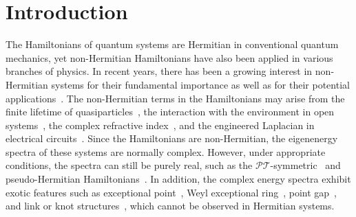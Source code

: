 \documentclass[prb,aps,twocolumn,showpacs]{revtex4-2} %
\begin{document}
\section{Introduction}\label{sect1}
The Hamiltonians of quantum systems are Hermitian in conventional quantum mechanics, yet non-Hermitian Hamiltonians have also been applied in various branches of physics. In recent years, there has been a growing interest in non-Hermitian systems for their fundamental importance as well as for their potential applications~\cite{Cao2015RMP,Konotop2016RMP,Ganainy2018NatPhy,Ashida2020AiP,Bergholtz2021RMP}. The non-Hermitian terms in the Hamiltonians may arise from the finite lifetime of quasiparticles~\cite{Fu2017arxiv,Shen2018PRL1,Yoshida2018PRB,Tao2021arxiv}, the interaction with the environment in open systems~\cite{Rotter1991RPP,Rotter2009JPA}, the complex refractive index~\cite{Musslimani2008PRL,Moiseyev2008PRL,Feng2017NatPho}, and the engineered Laplacian in electrical circuits~\cite{Schindler2011PRA,Luo2018arxiv,Lee2018ComPhy,Helbig2020NatPhys,Hofmann2020PRR,Zeng2020PRB}. Since the Hamiltonians are non-Hermitian, the eigenenergy spectra of these systems are normally complex. However, under appropriate conditions, the spectra can still be purely real, such as the $\mathcal{PT}$-symmetric~\cite{Bender1998PRL,Bender2002PRL,Bender2007RPP} and pseudo-Hermitian Hamiltonians~\cite{Mostafazadeh2002JMP,Mostafazadeh2010IJMMP,Moiseyev2011Book,Zeng2020PRB1,Kawabata2020PRR,Zeng2021arxiv}. In addition, the complex energy spectra exhibit exotic features such as exceptional point~\cite{Heiss2012JPAMT}, Weyl exceptional ring~\cite{Xu2017PRL}, point gap~\cite{Gong2018PRX}, and link or knot structures~\cite{Carlstrom2018PRA,Carlstrom2019PRB,Yang2019PRB,Yang2020PRL1,Hu2021PRL,Yang2021CPL}, which cannot be observed in Hermitian systems.  
\end{document}
